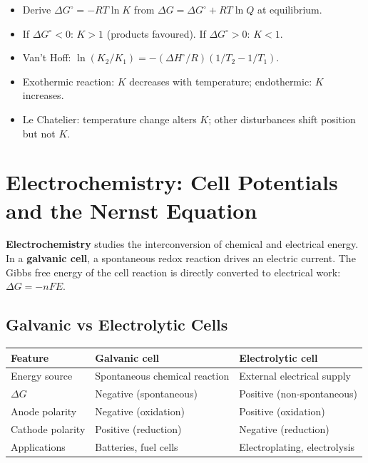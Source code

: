 \documentclass[12pt,a4paper]{article}
\begin{document}
\begin{tcolorbox}[exambox, title={Exam Points (Section 3)}]
\begin{itemize}[leftmargin=*, itemsep=2pt, topsep=2pt]
  \item Derive $\Delta G^\circ = -RT\ln K$ from $\Delta G = \Delta G^\circ + RT\ln Q$ at equilibrium.
  \item If $\Delta G^\circ < 0$: $K > 1$ (products favoured). If $\Delta G^\circ > 0$: $K < 1$.
  \item Van't Hoff: $\ln(K_2/K_1) = -(\Delta H^\circ/R)(1/T_2 - 1/T_1)$.
  \item Exothermic reaction: $K$ decreases with temperature; endothermic: $K$ increases.
  \item Le Chatelier: temperature change alters $K$; other disturbances shift position but not $K$.
\end{itemize}
\end{tcolorbox}

\section{Electrochemistry: Cell Potentials and the Nernst Equation}

\begin{tcolorbox}[defbox]
\textbf{Electrochemistry} studies the interconversion of chemical and electrical energy. In a \textbf{galvanic cell}, a spontaneous redox reaction drives an electric current. The Gibbs free energy of the cell reaction is directly converted to electrical work: $\Delta G = -nFE$.
\end{tcolorbox}

\subsection{Galvanic vs Electrolytic Cells}
\begin{tabularx}{\linewidth}{|B{2.6cm}|Y|Y|}
\hline
\textbf{Feature} & \textbf{Galvanic cell} & \textbf{Electrolytic cell} \\
\hline
Energy source & Spontaneous chemical reaction & External electrical supply \\
\hline
$\Delta G$ & Negative (spontaneous) & Positive (non-spontaneous) \\
\hline
Anode polarity & Negative (oxidation) & Positive (oxidation) \\
\hline
Cathode polarity & Positive (reduction) & Negative (reduction) \\
\hline
Applications & Batteries, fuel cells & Electroplating, electrolysis \\
\hline
\end{tabularx}
\end{document}
